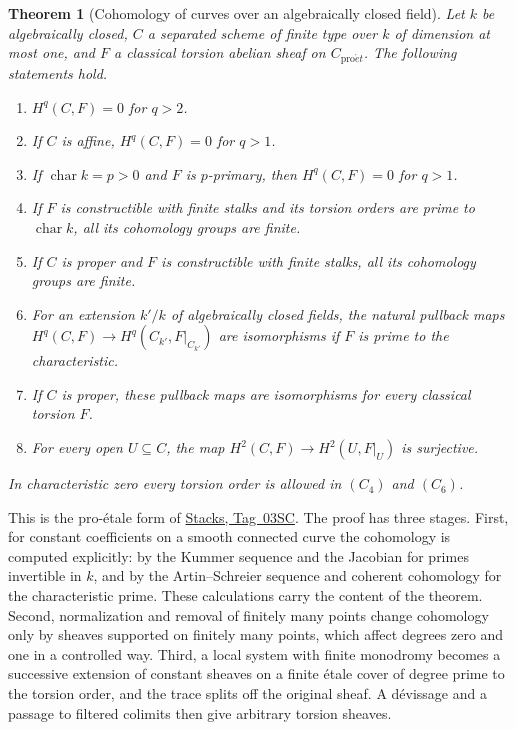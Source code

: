 \documentclass[11pt,a4paper]{article}
\numberwithin{equation}{section}
\newtheorem{theorem}{Theorem}[section]
\theoremstyle{definition}
\theoremstyle{remark}
\newcommand{\proet}{\mathrm{pro}\acute{e}t}
\newcommand{\stacks}[1]{\href{https://stacks.math.columbia.edu/tag/#1}{\textnormal{Stacks, Tag~#1}}}
\begin{document}
\begin{theorem}[Cohomology of curves over an algebraically closed field]
\label{app:curve-package}
Let $k$ be algebraically closed, $C$ a separated scheme of finite type
over $k$ of dimension at most one, and $F$ a classical torsion abelian
sheaf on $C_{\proet}$.  The following statements hold.
\begin{enumerate}[label=$(C_{\arabic*})$,leftmargin=3.5em]
\item $H^q(C,F)=0$ for $q>2$.
\item If $C$ is affine, $H^q(C,F)=0$ for $q>1$.
\item If $\operatorname{char}k=p>0$ and $F$ is $p$-primary, then
  $H^q(C,F)=0$ for $q>1$.
\item If $F$ is constructible with finite stalks and its torsion orders
  are prime to $\operatorname{char}k$, all its cohomology groups are finite.
\item If $C$ is proper and $F$ is constructible with finite stalks,
  all its cohomology groups are finite.
\item For an extension $k'/k$ of algebraically closed fields, the natural
  pullback maps $H^q(C,F)\to H^q(C_{k'},F|_{C_{k'}})$ are isomorphisms
  if $F$ is prime to the characteristic.
\item If $C$ is proper, these pullback maps are isomorphisms for every
  classical torsion $F$.
\item For every open $U\subseteq C$, the map
  $H^2(C,F)\to H^2(U,F|_U)$ is surjective.
\end{enumerate}
In characteristic zero every torsion order is allowed in $(C_4)$ and
$(C_6)$.
\end{theorem}

This is the pro-\'etale form of \stacks{03SC}.  The proof has three
stages.  First, for constant coefficients on a smooth connected curve
the cohomology is computed explicitly: by the Kummer sequence and the
Jacobian for primes invertible in $k$, and by the Artin--Schreier
sequence and coherent cohomology for the characteristic prime.  These
calculations carry the content of the theorem.  Second,
normalization and removal of finitely many points change cohomology
only by sheaves supported on finitely many points, which affect degrees
zero and one in a controlled way.  Third, a local system with finite
monodromy becomes a successive extension of constant sheaves on a
finite \'etale cover of degree prime to the torsion order, and the
trace splits off the original sheaf.  A d\'evissage and a passage to
filtered colimits then give arbitrary torsion sheaves.
\end{document}

